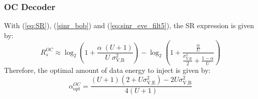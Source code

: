 \documentclass[journal,comsoc]{IEEEtran}
\begin{document}
\subsubsection{OC Decoder}
With (\ref{eq:SR}), (\ref{sinr_bob}) and (\ref{eq:sinr_eve_filt5}), the SR expression is given by:
\begin{equation}
R_s^{OC} \approx \log_2 \left( 1 +  \frac{\alpha \;(U+1)}{U \; \sigma_{\text{V,B}}^2} \right) - \log_2\left( 1 +  \frac{\frac{\alpha }{U}}{\frac{\sigma^2_{\text{V,E}}}{2} + \frac{1-\alpha}{U}}\right)
\label{eq:SR_anal2_decod_5}
\end{equation}
Therefore, the optimal amount of data energy to inject is given by:
\begin{equation}
\alpha_{\text{opt}}^{OC} = \frac{(U+1)(2+U\sigma_{\text{V,E}}^2) - 2U\sigma_{\text{V,B}}^2 }{4(U+1)}
\label{eq:optimal_alpha_decod_5}
\end{equation}


\end{document}
